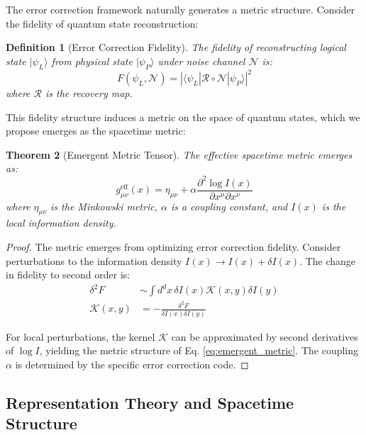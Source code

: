 \documentclass[12pt,a4paper]{article}
\newtheorem{theorem}{Theorem}[section]
\newtheorem{definition}[theorem]{Definition}
\theoremstyle{remark}
\begin{document}
The error correction framework naturally generates a metric structure. Consider the fidelity of quantum state reconstruction:

\begin{definition}[Error Correction Fidelity]
The fidelity of reconstructing logical state $|\psi_L\rangle$ from physical state $|\psi_P\rangle$ under noise channel $\mathcal{N}$ is:
\begin{equation}
F(\psi_L, \mathcal{N}) = |\langle\psi_L|\mathcal{R}\circ\mathcal{N}|\psi_P\rangle|^2
\end{equation}
where $\mathcal{R}$ is the recovery map.
\end{definition}

This fidelity structure induces a metric on the space of quantum states, which we propose emerges as the spacetime metric:

\begin{theorem}[Emergent Metric Tensor]
\label{thm:emergent_metric}
The effective spacetime metric emerges as:
\begin{equation}
g_{\mu\nu}^{\text{eff}}(x) = \eta_{\mu\nu} + \alpha \frac{\partial^2 \log I(x)}{\partial x^\mu \partial x^\nu}
\label{eq:emergent_metric}
\end{equation}
where $\eta_{\mu\nu}$ is the Minkowski metric, $\alpha$ is a coupling constant, and $I(x)$ is the local information density.
\end{theorem}

\begin{proof}
The metric emerges from optimizing error correction fidelity. Consider perturbations to the information density $I(x) \to I(x) + \delta I(x)$. The change in fidelity to second order is:
\begin{align}
\delta^2 F &\sim \int d^dx \, \delta I(x) \mathcal{K}(x,y) \delta I(y) \\
\mathcal{K}(x,y) &= -\frac{\delta^2 F}{\delta I(x)\delta I(y)}
\end{align}

For local perturbations, the kernel $\mathcal{K}$ can be approximated by second derivatives of $\log I$, yielding the metric structure of Eq. \ref{eq:emergent_metric}. The coupling $\alpha$ is determined by the specific error correction code.
\end{proof}

\subsection{Representation Theory and Spacetime Structure}
\end{document}
